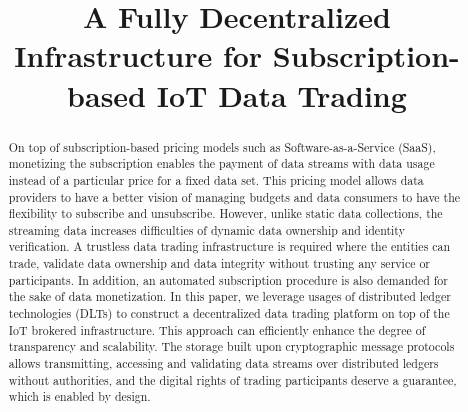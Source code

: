 \documentclass[10pt, conference, compsocconf]{IEEEtran}
\begin{document}
\title{A Fully Decentralized Infrastructure for Subscription-based IoT Data Trading}

\author{
\and
{}
\and
{}
\and
{}
}


\maketitle


\begin{abstract}
On top of subscription-based pricing models such as Software-as-a-Service (SaaS), monetizing the subscription enables the payment of data streams with data usage instead of a particular price for a fixed data set. This pricing model allows data providers to have a better vision of managing budgets and data consumers to have the flexibility to subscribe and unsubscribe. However, unlike static data collections, the streaming data increases difficulties of dynamic data ownership and identity verification. A trustless data trading infrastructure is required where the entities can trade, validate data ownership and data integrity without trusting any service or participants. In addition, an automated subscription procedure is also demanded for the sake of data monetization. In this paper, we leverage usages of distributed ledger technologies (DLTs) to construct a decentralized data trading platform on top of the IoT brokered infrastructure. This approach can efficiently enhance the degree of transparency and scalability. The storage built upon cryptographic message protocols allows transmitting, accessing and validating data streams over distributed ledgers without authorities, and the digital rights of trading participants deserve a guarantee, which is enabled by design.
\end{abstract}
\end{document}

